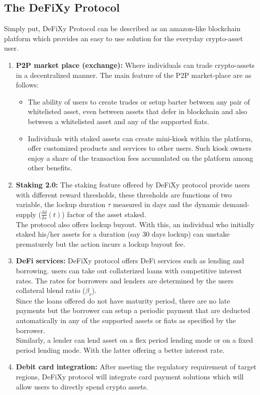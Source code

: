 \documentclass[12pt,onecolumn,letterpaper]{article} %
\begin{document}
\subsection{The DeFiXy Protocol}
Simply put, DeFiXy Protocol can be described as an amazon-like blockchain platform which provides an easy to use solution for the everyday crypto-asset user.
\begin{enumerate}
    \item \textbf{P2P market place (exchange):} %
    Where individuals can trade crypto-assets in a decentralized manner. The main feature of the P2P market-place are as follows:
\begin{itemize}
\item The ability of users to create trades or setup barter between any pair of whitelisted asset, even between assets that defer in blockchain and also between a whitelisted asset and any of the supported fiats.
\item Individuals with staked assets can create mini-kiosk within the platform, offer customized products and services to other users. Such kiosk owners enjoy a share of the transaction fees accumulated on the platform among other benefits.
\end{itemize}
    \item \textbf{Staking 2.0:} The staking feature offered by DeFiXy protocol provide users with different reward thresholds, these thresholds are functions of two variable, the lockup duration $\tau$ measured in days and the dynamic demand-supply ($\frac{\delta d}{\delta s}(t)$) factor of the asset staked.\\
    The protocol also offers lockup buyout. With this, an individual who initially staked his/her assets for a duration (say 30 days lockup) can unstake prematurely but the action incurs a lockup buyout fee. 
    \item \textbf{DeFi services:} DeFiXy protocol offers DeFi services such as lending and borrowing. users can take out collaterized loans with competitive interest rates. The rates for borrowers and lenders are determined by the users collateral blend ratio ($\beta_r$). \\Since the loans offered do not have maturity period, there are no late payments but the borrower can setup a periodic payment that are deducted automatically in any of the supported assets or fiats as specified by the borrower.\\
    Similarly, a lender can lend asset on a flex period lending mode or on a fixed period lending mode. With the latter offering a better interest rate.
    \item\textbf{Debit card integration:} After meeting the regulatory requirement of target regions, DeFiXy protocol will integrate card payment solutions which will allow users to directly spend crypto assets. 
   \end{enumerate}
\end{document}
